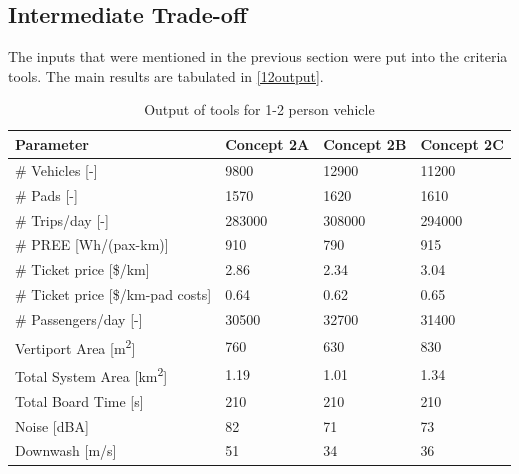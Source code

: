 \subsection{Intermediate Trade-off}

The inputs that were mentioned in the previous section were put into the criteria tools. The main results are tabulated in \autoref{12output}.

\begin{table}[H]
\captionsetup{justification=centering}
\caption{Output of tools for 1-2 person vehicle}
\label{12output}
\begin{tabular}{@{}llll@{}}
\toprule
\textbf{Parameter}                           & \textbf{Concept 2A} & \textbf{Concept 2B} & \textbf{Concept 2C} \\ \midrule
\# Vehicles {[}-{]}                          &         9800          &        12900        &           11200         \\
\# Pads {[}-{]}                               &       1570           &    1620      &  1610  \\
\# Trips/day {[}-{]}                         &          283000          &     308000          &           294000         \\
\#  PREE {[}Wh/(pax-km){]}           &          910          &       790     &        915      \\
\# Ticket price {[}\$/km{]}                  & 2.86                   & 2.34                   & 3.04                    \\
\# Ticket price {[}\$/km-pad costs{]}        & 0.64                    & 0.62                   & 0.65                   \\
\# Passengers/day {[}-{]}                    &          30500          &     32700        &           31400        \\
Vertiport Area {[}m\textsuperscript{2}{]}    &          760          &      630        &           830      \\
Total System Area {[}km\textsuperscript{2}{]} &          1.19         &     1.01  &         1.34         \\
Total Board Time {[}s{]}                     &          210          &     210               &               210     \\
Noise {[}dBA{]}                              &             82       &     71          &           73        \\
Downwash {[}m/s{]}                              &             51       &     34          &           36        \\ \bottomrule
\end{tabular}
\end{table}

